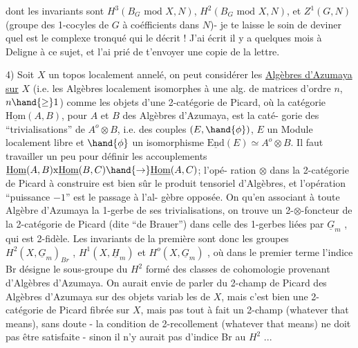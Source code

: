 
dont les invariants sont $H^3(B_G \text{ mod } X,N)$, $H^2(B_G \text{ mod } X,N)$, et $Z^1(G,N)$ (groupe
des 1-cocyles de $G$ à coéfficients dans $N$)- je te laisse le soin de deviner
quel est le complexe tronqué qui le décrit ! J'ai écrit il y a quelques
mois à Deligne à ce sujet, et l'ai prié de t'envoyer une copie de 
la lettre.

4) Soit $X$ un topos localement annelé, on peut considérer les \uline{Algèbres
d'Azumaya sur} $X$ (i.e. les Algèbres localement isomorphes à une alg. de
matrices d'ordre $n$, $n \hand{\geq} 1$) comme les objets d'une 2-catégorie de Picard,
où la catégorie $\underline{\mathrm{Hom}}(A,B)$, pour $A$ et $B$ des Algèbres d'Azumaya, est la caté-%
gorie des ``trivialisations'' de $A^o\otimes B$, i.e. des couples $(E,\hand{\phi})$, $E$ un Module
localement libre et $\hand{\phi}$ un isomorphisme $\underline{\mathrm{End}}(E)\simeq A^o\otimes B$. Il faut travailler
un peu pour définir les accouplements $\underline{\mathrm{Hom}}(A,B)\mathrm{x}\underline{\mathrm{Hom}}(B,C)\hand{\to}\underline{\mathrm{Hom}}(A,C)$; l'opé-%
ration $\otimes$ dans la 2-catégorie de Picard à construire est bien sûr le produit
tensoriel d'Algèbres, et l'opération ``puissance $-1$'' est le passage à l'al-%
gèbre opposée. On  qu'en
associant à toute Algèbre d'Azumaya la 1-gerbe de ses trivialisations, on
trouve un 2-$\otimes$-foncteur de la 2-catégorie de Picard (dite ``de Brauer'') dans
celle des 1-gerbes liées par $\underline{G}_m$ , qui est 2-fidèle. Les invariants de
la première sont donc les groupes $H^2(X,\underline{G}_m)_{Br}$ , $H^1(X,\underline{H}_m)$ et $H^o(X,\underline{G}_m)$ , où
dans le premier terme l'indice Br désigne le sous-groupe du $H^2$ formé des
classes de cohomologie provenant d'Algèbres d'Azumaya. On aurait envie
de parler du 2-champ de Picard des Algèbres d'Azumaya sur des objets variab
les de $X$, mais c'est bien une 2-catégorie de Picard fibrée sur $X$, mais pas
tout à fait un 2-champ (whatever that means), sans doute - la condition de
2-recollement (whatever that means) ne doit pas être satisfaite - sinon il
n'y aurait pas d'indice Br au $H^2$ ...

